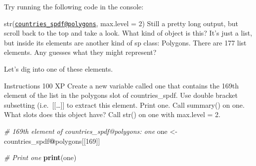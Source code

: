 \documentclass[]{article}
\newenvironment{Shaded}{\begin{snugshade}}{\end{snugshade}}
\newcommand{\CommentTok}[1]{\textcolor[rgb]{0.56,0.35,0.01}{\textit{#1}}}
\newcommand{\DecValTok}[1]{\textcolor[rgb]{0.00,0.00,0.81}{#1}}
\newcommand{\KeywordTok}[1]{\textcolor[rgb]{0.13,0.29,0.53}{\textbf{#1}}}
\newcommand{\NormalTok}[1]{#1}
\newcommand{\OperatorTok}[1]{\textcolor[rgb]{0.81,0.36,0.00}{\textbf{#1}}}
\newcommand{\StringTok}[1]{\textcolor[rgb]{0.31,0.60,0.02}{#1}}
\begin{document}
Try running the following code in the console:

str(\href{mailto:countries_spdf@polygons}{\nolinkurl{countries\_spdf@polygons}},
max.level = 2) Still a pretty long output, but scroll back to the top
and take a look. What kind of object is this? It's just a list, but
inside its elements are another kind of sp class: Polygons. There are
177 list elements. Any guesses what they might represent?

Let's dig into one of these elements.

Instructions 100 XP Create a new variable called one that contains the
169th element of the list in the polygons slot of countries\_spdf. Use
double bracket subsetting (i.e.~{[}{[}\ldots{]}{]} to extract this
element. Print one. Call summary() on one. What slots does this object
have? Call str() on one with max.level = 2.

\begin{Shaded}
\begin{Highlighting}[]
\CommentTok{# 169th element of countries_spdf@polygons: one}
\NormalTok{one <-}\StringTok{ }\NormalTok{countries_spdf}\OperatorTok{@}\NormalTok{polygons[[}\DecValTok{169}\NormalTok{]]}

\CommentTok{# Print one}
\KeywordTok{print}\NormalTok{(one)}
\end{Highlighting}
\end{Shaded}
\end{document}
